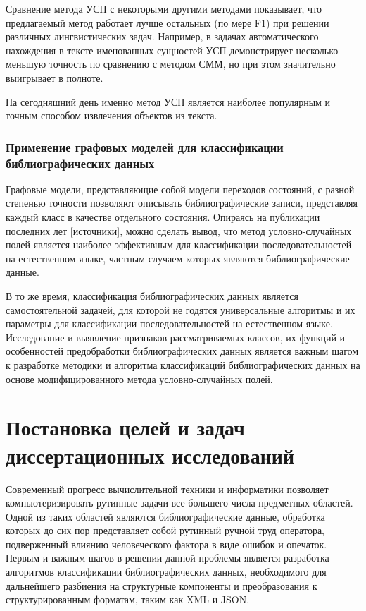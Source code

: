 Сравнение метода УСП с некоторыми другими методами показывает, что предлагаемый метод работает лучше остальных (по мере F1) при решении различных лингвистических задач. Например, в задачах автоматического нахождения в тексте именованных сущностей УСП демонстрирует несколько меньшую точность по сравнению с методом СММ, но при этом значительно выигрывает в полноте.

На сегодняшний день именно метод УСП является наиболее популярным и точным способом извлечения объектов из текста.

\subsubsection*{Применение графовых моделей для классификации библиографических данных}
Графовые модели, представляющие собой модели переходов состояний, с разной степенью точности позволяют описывать библиографические записи, представляя каждый класс в качестве отдельного состояния. Опираясь на публикации последних лет [источники], можно сделать вывод, что метод условно-случайных полей является наиболее эффективным для классификации последовательностей на естественном языке, частным случаем которых являются библиографические данные. 

В то же время, классификация библиографических данных является самостоятельной задачей, для которой не годятся универсальные алгоритмы и их параметры для классификации последовательностей на естественном языке. Исследование и выявление признаков рассматриваемых классов, их функций и особенностей предобработки библиографических данных является важным шагом к разработке методики и алгоритма классификаций библиографических данных на основе модифицированного метода условно-случайных полей.

\section{Постановка целей и задач диссертационных исследований}

Современный прогресс вычислительной техники и информатики позволяет компьютеризировать рутинные задачи все большего числа предметных областей.
Одной из таких областей являются библиографические данные, обработка которых до сих пор представляет собой рутинный ручной труд оператора, подверженный влиянию человеческого фактора в виде ошибок и опечаток. Первым и важным шагов в решении данной проблемы является разработка алгоритмов классификации библиографических данных, необходимого для дальнейшего разбиения на структурные компоненты и преобразования к структурированным форматам, таким как XML и JSON.

